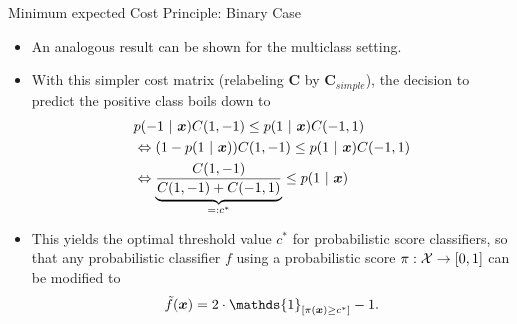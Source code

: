 \begin{vbframe}{Minimum expected Cost Principle: Binary Case}
{\begin{itemize}
		\lz
		\item An analogous result can be shown for the multiclass setting.
		
		
		\item With this simpler cost matrix (relabeling $\mathbf{C}$ by $\mathbf{C}_{simple}$), the decision to predict the positive class boils down to 
%		
		\begin{align*}
%			 	
			& p(-1 ~|~ \xv ) C(1,-1)   \leq  	p(1 ~|~ \xv ) C(-1,1)  \\
%			
			&\Leftrightarrow (1- p(1 ~|~ \xv ) ) C(1,-1)   \leq  	p(1 ~|~ \xv ) C(-1,1) \\
%			
			&\Leftrightarrow \underbrace{\frac{C(1,-1)}{C(1,-1) + C(-1,1) } }_{=:c^*}  \leq  	p(1 ~|~ \xv ) \\
		\end{align*}
%	
		\item This yields the optimal threshold value $c^*$ for probabilistic score classifiers, so that any probabilistic classifier $f$ using a probabilistic score $\pi:\mathcal{X} \to [0,1]$ can be modified to
%		
		$$   \tilde f(\xv) = 2 \cdot \mathds{1}_{[ \pi(\xv) \geq c^*]} -1. $$
							
		\end{itemize}
	}
\end{vbframe}

	
